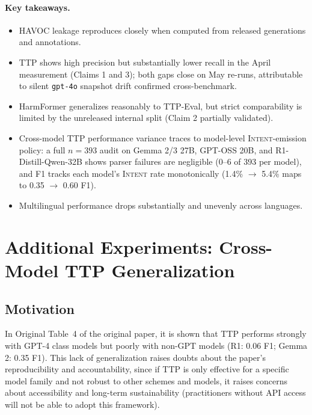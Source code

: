 \documentclass[10pt]{article} %
\newcommand{\origTable}[1]{Original Table~#1}
\begin{document}
\paragraph{Key takeaways.}
\begin{itemize}
    \setlength{\itemsep}{0pt}
    \setlength{\parskip}{0pt}
    \setlength{\topsep}{2pt}
    \setlength{\partopsep}{0pt}
    \item HAVOC leakage reproduces closely when computed from released generations and annotations.
    \item TTP shows high precision but substantially lower recall in the April measurement (Claims 1 and 3); both gaps close on May re-runs, attributable to silent \texttt{gpt-4o} snapshot drift confirmed cross-benchmark.
    \item HarmFormer generalizes reasonably to TTP-Eval, but strict comparability is limited by the unreleased internal split (Claim 2 partially validated).
    \item Cross-model TTP performance variance traces to model-level \textsc{Intent}-emission policy: a full $n=393$ audit on Gemma 2/3 27B, GPT-OSS 20B, and R1-Distill-Qwen-32B shows parser failures are negligible (0--6 of 393 per model), and F1 tracks each model's \textsc{Intent} rate monotonically (1.4\% $\to$ 5.4\% maps to 0.35 $\to$ 0.60 F1).
    \item Multilingual performance drops substantially and unevenly across languages.
\end{itemize}

\section{Additional Experiments: Cross-Model TTP Generalization}
\label{sec:cross-model}

\subsection{Motivation}
In \origTable{4} of the original paper, it is shown that TTP performs strongly with GPT-4 class models but poorly with non-GPT models (R1: 0.06 F1; Gemma 2: 0.35 F1). This lack of generalization raises doubts about the paper's reproducibility and accountability, since if TTP is only effective for a specific model family and not robust to other schemes and models, it raises concerns about accessibility and long-term sustainability (practitioners without API access will not be able to adopt this framework).  
\end{document}
